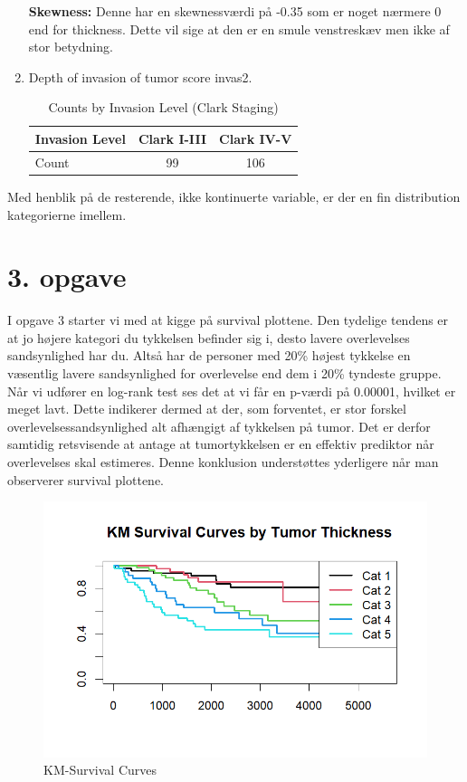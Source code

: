 \begin{enumerate}
\textbf{Skewness:} Denne har en skewnessværdi på -0.35 som er noget nærmere 0 end for thickness. Dette vil sige at den er en smule venstreskæv men ikke af stor betydning.
\item Depth of invasion of tumor score invas2.
\begin{table}[h!]
    \centering
    \begin{tabular}{|l|c|c|}
        \hline
        Invasion Level & Clark I-III & Clark IV-V \\
        \hline
        Count & 99 & 106 \\
        \hline
    \end{tabular}
    \caption{Counts by Invasion Level (Clark Staging)}
    \label{tab:invasion_level}
\end{table}

\end{enumerate}

Med henblik på de resterende, ikke kontinuerte variable, er der en fin distribution kategorierne imellem.



\chapter{3. opgave}
I opgave 3 starter vi med at kigge på survival plottene. Den tydelige tendens er at jo højere kategori du tykkelsen befinder sig i, desto lavere overlevelses sandsynlighed har du. Altså har de personer med 20\% højest tykkelse en væsentlig lavere sandsynlighed for overlevelse end dem i 20\% tyndeste gruppe.\\
Når vi udfører en log-rank test ses det at vi får en p-værdi på 0.00001, hvilket er meget lavt. Dette indikerer dermed at der, som forventet, er stor forskel overlevelsessandsynlighed alt afhængigt af tykkelsen på tumor. Det er derfor samtidig retsvisende at antage at tumortykkelsen er en effektiv prediktor når overlevelses skal estimeres. Denne konklusion understøttes yderligere når man observerer survival plottene.
\begin{figure}[H]
    \centering
    \includegraphics[width=1\linewidth]{Formalities/Billeder/surv_curves_project.png}
    \caption{KM-Survival Curves}
    \label{surv_curv}
\end{figure}


